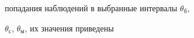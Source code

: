 попадания наблюдений в выбранные интервалы $\theta_{\mathrm{б}}$, 


$\theta_{\mathrm{с}}$, $\theta_{\mathrm{м}}$, их значения приведены\linebreak\vspace*{-12pt}


\pagebreak





\





\vspace*{-12pt}








\renewcommand{\figurename}{\protect\small\bf Таблица}


\setcounter{figure}{1}








